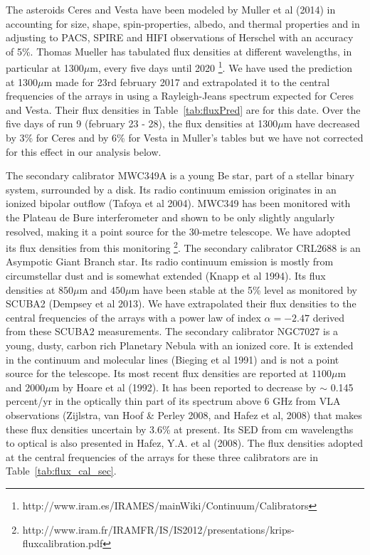 The asteroids Ceres and Vesta have been modeled by Muller et al (2014) in accounting for 
size, shape, spin-properties, albedo, and thermal properties and in adjusting to PACS, SPIRE and HIFI observations
of Herschel with an accuracy of 5\%. 
Thomas Mueller has tabulated flux densities at different wavelengths, in particular at 1300$\mu$m, every five days
until 2020 \footnote{http://www.iram.es/IRAMES/mainWiki/Continuum/Calibrators}.
We have used the prediction at  1300$\mu$m made for  23rd february 2017
and extrapolated it  to the central frequencies of the arrays in using a Rayleigh-Jeans
spectrum expected for Ceres and Vesta. Their flux densities in
Table~\ref{tab:fluxPred} are for this date. Over the five days of  run 9 (february 23 - 28), the
flux densities  at 1300$\mu$m  have decreased by  3\% 
for Ceres and  by 6\%  for Vesta in Muller's tables but we have not corrected for this effect in our analysis below.  

The secondary calibrator MWC349A is a young Be star, part of a stellar binary system, surrounded by a disk. Its radio
continuum emission originates in an ionized bipolar outflow (Tafoya et al 2004).
MWC349 has been monitored with the  Plateau de Bure interferometer
and shown to be only slightly angularly resolved, making it a point source for the 30-metre telescope. We have adopted
its flux densities from this monitoring \footnote{http://www.iram.fr/IRAMFR/IS/IS2012/presentations/krips-fluxcalibration.pdf}.
The secondary calibrator CRL2688 is an Asympotic Giant Branch star. Its radio continuum emission is mostly from circumstellar dust and
is somewhat extended  (Knapp et al 1994).
Its flux densities at $850\mu$m  and $450\mu$m  have been stable at the 5\% level as monitored by SCUBA2 (Dempsey et al 2013).
We have extrapolated their flux densities to the central frequencies
of the arrays with a power law of index $\alpha=-2.47$ derived from these SCUBA2 measurements.
The secondary calibrator NGC7027 is a young, dusty, carbon rich Planetary Nebula with an ionized core.
It is extended in the continuum and molecular lines (Bieging et al 1991) and  is not a point source for the telescope.
Its  most recent flux densities are reported at $1100\mu$m  and $2000\mu$m by Hoare et al (1992). It has been reported
to decrease by $\sim$ 0.145 percent/yr in the optically thin part of its spectrum above  $6$ GHz from VLA
observations (Zijlstra, van Hoof \& Perley 2008, and Hafez et al, 2008) that makes these flux densities uncertain by 3.6\%
at present. Its SED from cm wavelengths to optical is also presented in Hafez, Y.A. et al (2008).
The flux densities adopted at the central frequencies of the arrays for these three calibrators are in Table~\ref{tab:flux_cal_sec}.


